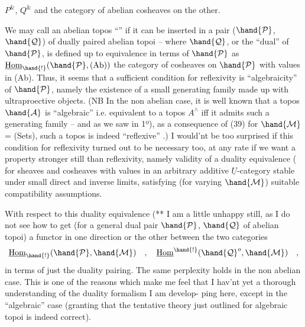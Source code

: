 
$P^{\&}$, $Q^{\&}$ and the category of abelian cosheaves on the other.

We may call an abelian topos ``'' if it can be inserted in a
pair ($\hand{\mathcal{P}}$,$\hand{\mathcal{Q}}$) of dually paired  abelian topoi -- where $\hand{\mathcal{Q}}$, or the
``dual'' of $\hand{\mathcal{P}}$, is defined up to equivalence in terms of $\hand{\mathcal{P}}$ as $\underline{\text{Hom}}_{\hand{!}}(\hand{\mathcal{P}},(\text{Ab}))$\hand{,}
the category of cosheaves on $\hand{\mathcal{P}}$ with values in (Ab). Thus, it seems that
a sufficient condition  for reflexivity is ``algebraicity'' of $\hand{\mathcal{P}}$, namely
the existence of a small generating family  made up with ultraproective
objects. (NB In the non abelian case, it is well known that a topos
$\hand{\mathcal{A}}$ is ``algebraic'' i.e. equivalent to a topos $A^{\wedge}$\hand{,} iff it admits such a
generating family -- and as we saw in 1º), as a consequence of (39)
for $\hand{\mathcal{M}}$= (Sets), such a topos is indeed ``reflexive'' .) I would'nt be
too surprised if this   condition for reflexivity turned out to
be necessary too, at any rate if we want a property stronger still than
reflexivity, namely validity of a duality equivalence (\over{**}{**}\hand{*}\over{)}{)} for sheaves
and cosheaves with values in an arbitrary additive $\underline{U}$-category stable under
small direct and inverse limits, satisfying (for varying $\hand{\mathcal{M}}$) suitable
compatibility assumptions.

 With respect to this duality equivalence (**\hand{*}\over{)}{)}\hand{,} I am a little unhappy
still, as I do not see how to get (for a general dual pair $\hand{\mathcal{P}}$, $\hand{\mathcal{Q}}$ of
abelian topoi) a functor in one direction or the other between the two
categories
\[ \underline{\text{Hom}}_{\hand{!}}(\hand{\mathcal{P}},\hand{\mathcal{M}}) \quad , \quad \underline{\text{Hom}}^{\hand{!}}(\hand{\mathcal{Q}}^{o},\hand{\mathcal{M}}) \quad , \]
in terms of just the duality pairing. The same perplexity holds in the
non abelian case. This is one of the reasons which make me feel that I
hav'nt yet a thorough understanding of the duality formalism I am develop-%
ping here, except in the ``algebraic'' case (granting  that the tentative
theory just outlined for algebraic \hand{\uline{\textcolor{black}{abelian}}} topoi is indeed correct).

